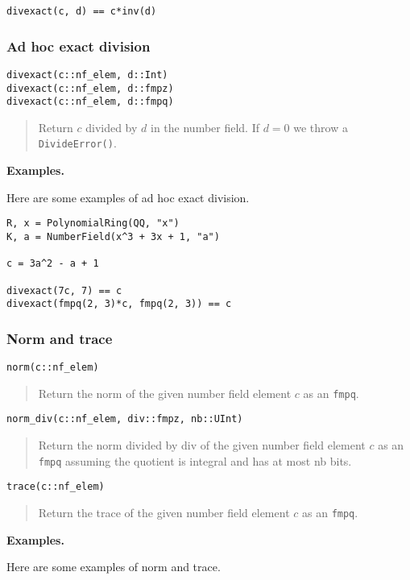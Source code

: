 \documentclass[a4paper,10pt]{article}
\newcommand{\code}{\lstinline}
\newcommand{\desc}[1]{\vspace{-3mm}\begin{quote}#1\end{quote}}
\begin{document}
{{\begin{lstlisting}
divexact(c, d) == c*inv(d)
\end{lstlisting}

\subsubsection{Ad hoc exact division}

\begin{lstlisting}
divexact(c::nf_elem, d::Int)
divexact(c::nf_elem, d::fmpz)
divexact(c::nf_elem, d::fmpq)
\end{lstlisting}

\desc{Return $c$ divided by $d$ in the number field. If $d = 0$ we
throw a \code{DivideError()}.}

\textbf{Examples.}

Here are some examples of ad hoc exact division.

\begin{lstlisting}
R, x = PolynomialRing(QQ, "x")
K, a = NumberField(x^3 + 3x + 1, "a")

c = 3a^2 - a + 1

divexact(7c, 7) == c
divexact(fmpq(2, 3)*c, fmpq(2, 3)) == c
\end{lstlisting}

\subsubsection{Norm and trace}

\begin{lstlisting}
norm(c::nf_elem)
\end{lstlisting}

\desc{Return the norm of the given number field element $c$ as an \code{fmpq}.}

\begin{lstlisting}
norm_div(c::nf_elem, div::fmpz, nb::UInt)
\end{lstlisting}

\desc{Return the norm divided by div of the given number field element $c$
as an \code{fmpq} assuming the quotient is integral and has at most nb bits.}

\begin{lstlisting}
trace(c::nf_elem)
\end{lstlisting}

\desc{Return the trace of the given number field element $c$ as an \code{fmpq}.}

\textbf{Examples.}

Here are some examples of norm and trace.

}}
\end{document}
